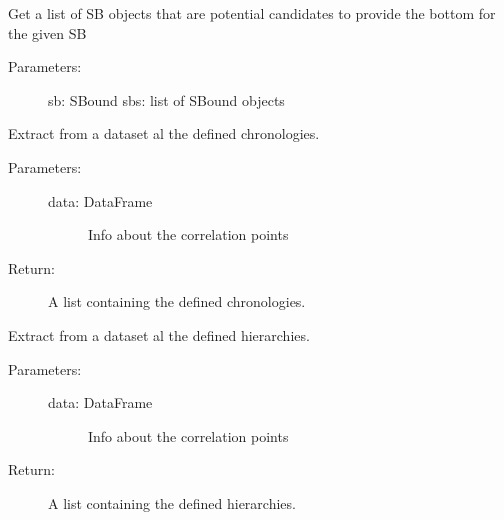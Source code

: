 \documentclass[letterpaper,10pt,english]{sphinxmanual}
\begin{document}
\begin{fulllineitems}
\label{\detokenize{hiegeo:hiegeo.get_top_sb}}
Get a list of SB objects that are potential candidates to
provide the bottom for the given SB
\begin{description}
\item[{Parameters:}] \leavevmode
sb: SBound
sbs: list of SBound objects

\end{description}

\end{fulllineitems}


\begin{fulllineitems}
\label{\detokenize{hiegeo:hiegeo.get_unique_chronology}}
Extract from a dataset al the defined chronologies.
\begin{description}
\item[{Parameters:}] \leavevmode\begin{description}
\item[{data: DataFrame}] \leavevmode
Info about the correlation points

\end{description}

\item[{Return:}] \leavevmode
A list containing the defined chronologies.

\end{description}

\end{fulllineitems}


\begin{fulllineitems}
\label{\detokenize{hiegeo:hiegeo.get_unique_hierarchy}}
Extract from a dataset al the defined hierarchies.
\begin{description}
\item[{Parameters:}] \leavevmode\begin{description}
\item[{data: DataFrame}] \leavevmode
Info about the correlation points

\end{description}

\item[{Return:}] \leavevmode
A list containing the defined hierarchies.

\end{description}

\end{fulllineitems}
\end{document}
